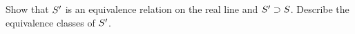 \documentclass[main.tex]{subfiles}
\begin{document}
\subproblem{}\label{s03p05a}

Show that \({S'}\) is an equivalence relation on the real line and
\({S'} \supset {S}\). Describe the equivalence classes of
\({S'}\).

\todo{}
\end{document}
